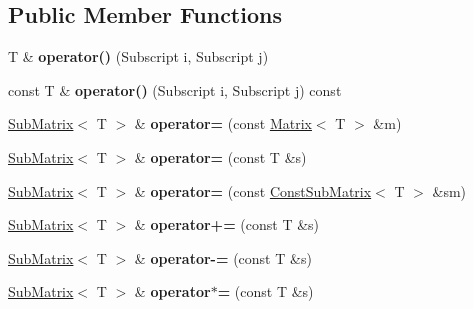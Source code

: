 \subsection*{Public Member Functions}
\begin{DoxyCompactItemize}
\item 
\mbox{\label{classTLAS_1_1SubMatrix_a4c6e634be3c1b46e779318754c4e0cbd}} 
T \& {\bfseries operator()} (Subscript i, Subscript j)
\item 
\mbox{\label{classTLAS_1_1SubMatrix_a817c87614331ecbda4e2315292fb128c}} 
const T \& {\bfseries operator()} (Subscript i, Subscript j) const
\item 
\mbox{\label{classTLAS_1_1SubMatrix_a6a3522f22858e9292254bd05141c94c7}} 
\hyperlink{classTLAS_1_1SubMatrix}{Sub\+Matrix}$<$ T $>$ \& {\bfseries operator=} (const \hyperlink{classTLAS_1_1Matrix}{Matrix}$<$ T $>$ \&m)
\item 
\mbox{\label{classTLAS_1_1SubMatrix_a831f27394d547903825fbc621d1979c1}} 
\hyperlink{classTLAS_1_1SubMatrix}{Sub\+Matrix}$<$ T $>$ \& {\bfseries operator=} (const T \&s)
\item 
\mbox{\label{classTLAS_1_1SubMatrix_a0d22f383edddc17c9b1eb0758c655e6e}} 
\hyperlink{classTLAS_1_1SubMatrix}{Sub\+Matrix}$<$ T $>$ \& {\bfseries operator=} (const \hyperlink{classTLAS_1_1ConstSubMatrix}{Const\+Sub\+Matrix}$<$ T $>$ \&sm)
\item 
\mbox{\label{classTLAS_1_1SubMatrix_af535df63943ac6f61580a261bb1fa916}} 
\hyperlink{classTLAS_1_1SubMatrix}{Sub\+Matrix}$<$ T $>$ \& {\bfseries operator+=} (const T \&s)
\item 
\mbox{\label{classTLAS_1_1SubMatrix_a27370b493360675e857e730ad005b276}} 
\hyperlink{classTLAS_1_1SubMatrix}{Sub\+Matrix}$<$ T $>$ \& {\bfseries operator-\/=} (const T \&s)
\item 
\mbox{\label{classTLAS_1_1SubMatrix_abf42fee8333795ccf936c8276aa4af71}} 
\hyperlink{classTLAS_1_1SubMatrix}{Sub\+Matrix}$<$ T $>$ \& {\bfseries operator$\ast$=} (const T \&s)

\end{DoxyCompactItemize}
